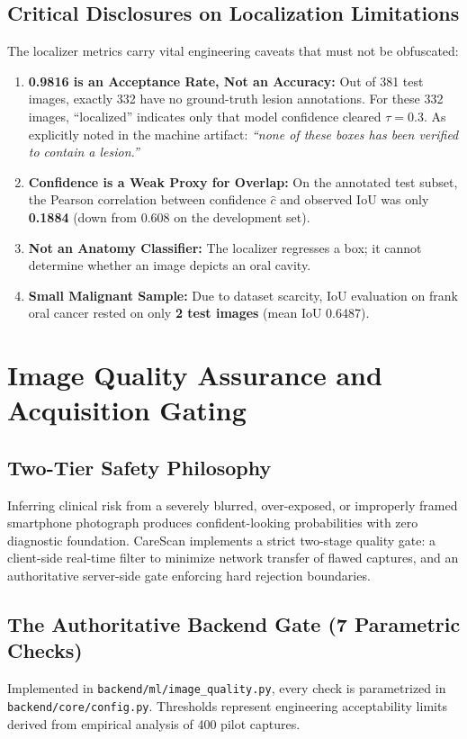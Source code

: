 \documentclass[11pt,a4paper]{report}
\newcommand{\artifact}[1]{\texttt{\footnotesize #1}}
\begin{document}
\section{Critical Disclosures on Localization Limitations}
The localizer metrics carry vital engineering caveats that must not be obfuscated:
\begin{enumerate}
  \item \textbf{0.9816 is an Acceptance Rate, Not an Accuracy:} Out of 381 test images, exactly 332 have no ground-truth lesion annotations. For these 332 images, ``localized'' indicates only that model confidence cleared $\tau = 0.3$. As explicitly noted in the machine artifact: \textit{``none of these boxes has been verified to contain a lesion.''}
  \item \textbf{Confidence is a Weak Proxy for Overlap:} On the annotated test subset, the Pearson correlation between confidence $\hat{c}$ and observed IoU was only \textbf{0.1884} (down from 0.608 on the development set).
  \item \textbf{Not an Anatomy Classifier:} The localizer regresses a box; it cannot determine whether an image depicts an oral cavity.
  \item \textbf{Small Malignant Sample:} Due to dataset scarcity, IoU evaluation on frank oral cancer rested on only \textbf{2 test images} (mean IoU 0.6487).
\end{enumerate}

\chapter{Image Quality Assurance and Acquisition Gating}

\section{Two-Tier Safety Philosophy}
Inferring clinical risk from a severely blurred, over-exposed, or improperly framed smartphone photograph produces confident-looking probabilities with zero diagnostic foundation. CareScan implements a strict two-stage quality gate: a client-side real-time filter to minimize network transfer of flawed captures, and an authoritative server-side gate enforcing hard rejection boundaries.

\section{The Authoritative Backend Gate (7 Parametric Checks)}
Implemented in \artifact{backend/ml/image\_quality.py}, every check is parametrized in \artifact{backend/core/config.py}. Thresholds represent engineering acceptability limits derived from empirical analysis of 400 pilot captures.
\end{document}
